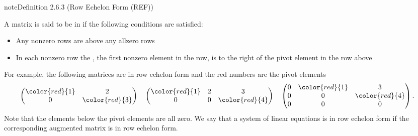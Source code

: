 \documentclass[letterpaper,10pt,english]{jupyterBook}
\begin{document}
\ignorespaces 
{}\ignorespaces \label{_pages/2.3_Gaussian_elimination:ref-definition}
\begin{sphinxadmonition}{note}{Definition 2.6.3 (Row Echelon Form (REF))}



\sphinxAtStartPar
A matrix is said to be in  if the following conditions are satisfied:
\begin{itemize}
\item {} 
\sphinxAtStartPar
Any non\sphinxhyphen{}zero rows are above any all\sphinxhyphen{}zero rows

\item {} 
\sphinxAtStartPar
In each non\sphinxhyphen{}zero row the , the first non\sphinxhyphen{}zero element in the row, is to the right of the pivot element in the row above

\end{itemize}
\end{sphinxadmonition}

\sphinxAtStartPar
For example, the following matrices are in row echelon form and the red numbers are the pivot elements
\begin{equation*}
\begin{split} \begin{align*}
    &\begin{pmatrix} \color{red}{1} & 2 \\ 0 & \color{red}{3} \end{pmatrix} &
    &\begin{pmatrix} \color{red}{1} & 2 & 3 \\ 0 & 0 & \color{red}{4} \end{pmatrix} &
    &\begin{pmatrix} 0 & \color{red}{1} & 3\\ 0 & 0 & \color{red}{4} \\ 0 & 0 & 0\end{pmatrix}.
\end{align*} \end{split}
\end{equation*}
\sphinxAtStartPar
Note that the elements below the pivot elements are all zero. We say that a system of linear equations is in row echelon form if the corresponding augmented matrix is in row echelon form.
\end{document}
